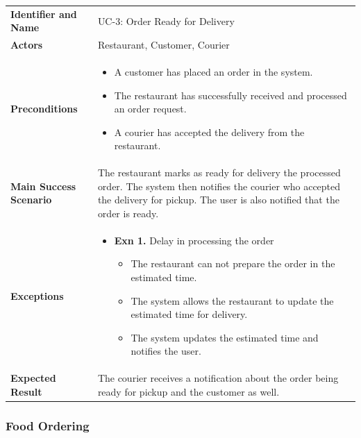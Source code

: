 \noindent
\begin{tabularx}{\textwidth}{l X}
    \textbf{Identifier and Name} & UC-3: Order Ready for Delivery \\
    \textbf{Actors} & Restaurant, Customer, Courier \\
    \textbf{Preconditions} & 
    \begin{itemize} 
        \item A customer has placed an order in the system.  
        \item The restaurant has successfully received and processed an order request.
        \item A courier has accepted the delivery from the restaurant.
    \end{itemize} \\
    \textbf{Main Success Scenario} & The restaurant marks as ready for delivery the processed order. The system then notifies the courier who accepted the delivery for pickup. The user is also notified that the order is ready. \\
    \textbf{Exceptions} & \begin{itemize} 
        \item \textbf{Exn 1.} Delay in processing the order
         \begin{itemize} 
            \item The restaurant can not prepare the order in the estimated time.
            \item The system allows the restaurant to update the estimated time for delivery.
            \item The system updates the estimated time and notifies the user.
         \end{itemize}
    \end{itemize} \\
    \textbf{Expected Result} & The courier receives a notification about the order being ready for pickup and the customer as well.
\end{tabularx}

\subsubsection{Food Ordering}

